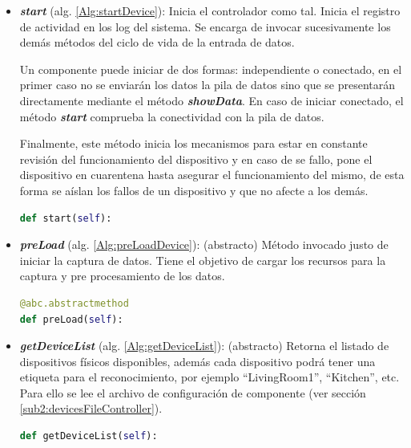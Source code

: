         \begin{itemize}
        
            \item \textbf{\textit{start}} (alg. \ref{Alg:startDevice}): 
            Inicia el controlador como tal. Inicia el registro de actividad en los log del sistema. Se encarga de invocar sucesivamente los demás métodos del ciclo de vida de la entrada de datos. 
            
            Un componente puede iniciar de dos formas: independiente o conectado, en el primer caso no se enviarán los datos la pila de datos sino que se presentarán directamente mediante el método \textbf{\textit{showData}}. En caso de iniciar conectado, el método \textbf{\textit{start}} comprueba la conectividad con la pila de datos.
            
            Finalmente, este método inicia los mecanismos para estar en constante revisión del funcionamiento del dispositivo y en caso de se fallo, pone el dispositivo en cuarentena hasta asegurar el funcionamiento del mismo, de esta forma se aíslan los fallos de un dispositivo y que no afecte a los demás. 
            
            \begin{lstlisting}[language=Python, caption={Firma del método ``\textit{start}''.}, label=Alg:startDevice, numbers=none]
def start(self):
            \end{lstlisting}
        
            \item \textbf{\textit{preLoad}} (alg. \ref{Alg:preLoadDevice}):
            (abstracto) Método invocado justo de iniciar la captura de datos. Tiene el objetivo de cargar los recursos para la captura y pre procesamiento de los datos.
            
            \begin{lstlisting}[language=Python, caption={Firma del método \textit{preLoad} de DeviceController.}, label=Alg:preLoadDevice, numbers=none]
@abc.abstractmethod
def preLoad(self):
            \end{lstlisting}
            
            \item \textbf{\textit{getDeviceList}} (alg. \ref{Alg:getDeviceList}):
            (abstracto) Retorna el listado de dispositivos físicos disponibles, además cada dispositivo podrá tener una etiqueta para el reconocimiento, por ejemplo ``LivingRoom1'', ``Kitchen'', etc. Para ello se lee el archivo de configuración de componente (ver sección \ref{sub2:devicesFileController}). 
            \begin{lstlisting}[language=Python, caption={Firma del método ``\textit{getDeviceList}''.}, label=Alg:getDeviceList, numbers=none]
def getDeviceList(self):
            \end{lstlisting}
            

\end{itemize}
